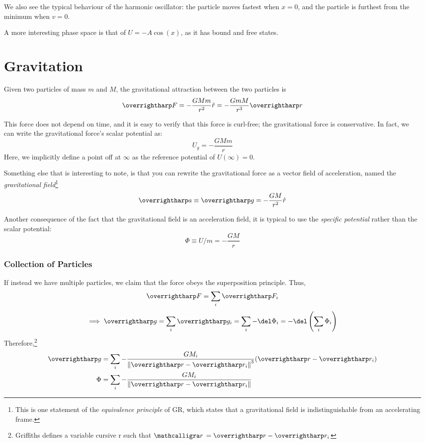 We also see the typical behaviour of the harmonic oscillator: the particle moves fastest when \(x=0\), and the particle is furthest from the minimum when \(v=0\).

A more interesting phase space is that of \(U=-A\cos(x)\), as it has bound and free states.

\section{Gravitation}
Given two particles of mass \(m\) and \(M\), the gravitational attraction between the two particles is 
\begin{equation}
	\vv{F}=-\frac{GMm}{r^2}\hat{r}=-\frac{GmM}{r^3}\vv{r}
\end{equation}

This force does not depend on time, and it is easy to verify that this force is curl-free; the gravitational force is conservative. In fact, we can write the gravitational force's scalar potential as:
\begin{equation}
	U_g=-\frac{GMm}{r}
\end{equation}
Here, we implicitly define a point off at \(\infty\) as the reference potential of \(U(\infty)=0\).

Something else that is interesting to note, is that you can rewrite the gravitational force as a vector field of acceleration, named the \emph{gravitational field}\footnote{This is one statement of the \emph{equivalence principle} of GR, which states that a gravitational field is indistinguishable from an accelerating frame.}
\begin{equation}
	\vv{a}\equiv \vv{g} = -\frac{GM}{r^2}\hat{r}
\end{equation}

Another consequence of the fact that the gravitational field is an acceleration field, it is typical to use the \emph{specific potential} rather than the scalar potential:
\begin{equation}
	\Phi \equiv U/m=-\frac{GM}{r}\label{eq1:spefu}
\end{equation}

\subsubsection{Collection of Particles}
If instead we have multiple particles, we claim that the force obeys the superposition principle. Thus,
\[\vv{F}=\sum_i \vv{F}_i\]
\[\then \vv{g}=\sum_i \vv{g_i}=\sum_i-\del\Phi_i=-\del\left(\sum_i\Phi_i\right)\]
\newpage
Therefore,\footnote{Griffiths defines a variable cursive r such that \(\sr=\vv{r}-\vv{r}_i\)}
\begin{subequations}
	\begin{align}
		\vv{g} &=\sum_i -\frac{G M_i}{\norm{\vv{r}-\vv{r}_i}^3}(\vv{r}-\vv{r}_i)\\
		\Phi &= \sum_i -\frac{GM_i}{\norm{\vv{r}-\vv{r}_i}}
	\end{align}
\end{subequations}
